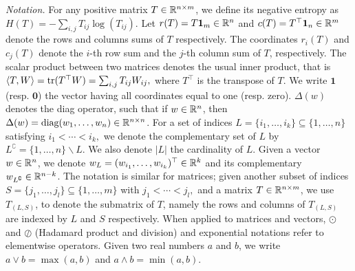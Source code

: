 \emph{Notation.} For any positive matrix $T \in {\mathbb{R}}^{n\times m}$, we define its negative entropy as $H(T) = -\sum_{i,j} T_{ij} \log(T_{ij}).$
Let $r(T) = T\mathbf 1_m \in {\mathbb{R}}^n$ and $c(T) = T^\top\mathbf 1_n \in {\mathbb{R}}^m$ denote the rows and columns sums of $T$ respectively. The coordinates $r_i(T)$ and $c_j(T)$ denote the $i$-th row sum and the $j$-th column sum of $T$, respectively.
The scalar product between two matrices denotes the usual inner product, that is $\langle T, W \rangle = \text{tr}(T^\top W) = \sum_{i,j}T_{ij}W_{ij},$ where $T^\top$ is the transpose of $T$. 
We write $\mathbf{1}$ (resp. $\mathbf{0}$) the vector having all coordinates equal to one (resp. zero).
$\Delta(w)$ denotes the diag operator, such that if $w \in {\mathbb{R}}^n$, then $\Delta(w) = \text{diag}(w_1, \ldots, w_n)\in {\mathbb{R}}^{n\times n}$.
For a set of indices $L=\{i_1, \ldots, i_k\} \subseteq \{1, \ldots, n\}$ satisfying $i_1 < \cdots <i_k,$ we denote the complementary set of $L$ by $L^\complement = \{1, \ldots, n\} \backslash L$. We also denote $|L|$ the cardinality of $L$.
Given a vector $w \in {\mathbb{R}}^n$, we denote $w_L= (w_{i_1}, \ldots, w_{i_k})^\top \in {\mathbb{R}}^k$ and its complementary $w_{L^\complement} \in {\mathbb{R}}^{n- k}$.  The notation is similar for matrices; given another subset of indices $S = \{j_1, \ldots, j_l\} \subseteq \{1, \ldots, m\}$ with $j_1 < \cdots <j_l,$ and a matrix $T\in {\mathbb{R}}^{n\times m}$, we use $T_{(L,S)}$, to denote the submatrix of $T$, namely the rows and columns of $T_{(L,S)}$ are indexed by $L$ and $S$ respectively.
When applied to matrices and vectors,  $\odot$ and $\oslash$ (Hadamard product and division) and exponential notations refer to elementwise operators.
Given two real numbers $a$ and $b$, we write $a\vee b = \max(a,b)$ and $a\wedge b = \min(a,b).$

